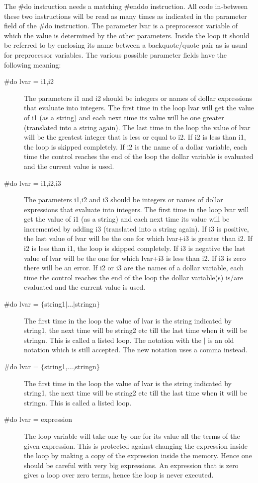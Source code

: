 \noindent The \#do instruction needs a matching 
\#enddo instruction. All code in-between these two 
instructions will be read as many times as indicated in the parameter field 
of the \#do instruction. The parameter lvar is a preprocessor variable of 
which the value is determined by the other parameters. Inside the loop it 
should be referred to by enclosing its name between a backquote/quote pair 
as is usual for preprocessor variables. The various possible parameter 
fields have the following meaning:
\begin{description}
\item[\#do lvar = i1,i2] The parameters i1 and i2 should be integers or 
names of dollar expressions that evaluate into integers. The 
first time in the loop lvar will get the value of i1 (as a string) and each 
next time its value will be one greater (translated into a string again). 
The last time in the loop the value of lvar will be the greatest integer 
that is less or equal to i2. If i2 is less than i1, the loop is skipped 
completely. If i2 is the name of a dollar variable, each time the control 
reaches the end of the loop the dollar variable is evaluated and the 
current value is used.
\item[\#do lvar = i1,i2,i3] The parameters i1,i2 and i3 should be integers 
or names of dollar expressions that evaluate into integers. 
The first time in the loop lvar will get the value of i1 (as a string) and 
each next time its value will be incremented by adding i3 (translated into 
a string again). If i3 is positive, the last value of lvar will be the one 
for which lvar+i3 is greater than i2. If i2 is less than i1, the loop is 
skipped completely. If i3 is negative the last value of lvar will be the 
one for which lvar+i3 is less than i2. If i3 is zero there will be an 
error. If i2 or i3 are the names of a dollar variable, each time the control 
reaches the end of the loop the dollar variable(s) is/are evaluated and the 
current value is used.
\item[\#do lvar = $\{$string1$|$...$|$stringn$\}$] The first time in the 
loop the value of lvar is the string indicated by string1, the next time 
will be string2 etc till the last time when it will be stringn. This is 
called a listed loop. The notation 
with the $|$ is an old notation which is still accepted. The new notation 
uses a comma instead.
\item[\#do lvar = $\{$string1,...,stringn$\}$] The first time in the loop 
the value of lvar is the string indicated by string1, the next time will be 
string2 etc till the last time when it will be stringn. This is called a 
listed loop.
\item[\#do lvar = expression] The loop variable will take one by one for 
its value all the terms of the given expression. This is protected against 
changing the expression inside the loop by making a copy of the expression 
inside the memory. Hence one should be careful with very big expressions. 
An expression that is zero gives a loop over zero terms, hence the loop is 
never executed.
\end{description}
